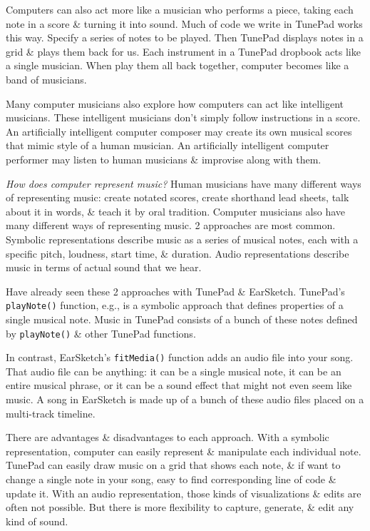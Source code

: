 \documentclass{article}
\begin{document}
\begin{itemize}
\begin{itemize}
		Computers can also act more like a musician who performs a piece, taking each note in a score \& turning it into sound. Much of code we write in TunePad works this way. Specify a series of notes to be played. Then TunePad displays notes in a grid \& plays them back for us. Each instrument in a TunePad dropbook acts like a single musician. When play them all back together, computer becomes like a band of musicians.
		
		Many computer musicians also explore how computers can act like intelligent musicians. These intelligent musicians don't simply follow instructions in a score. An artificially intelligent computer composer may create its own musical scores that mimic style of a human musician. An artificially intelligent computer performer may listen to human musicians \& improvise along with them.
		
		{\it How does computer represent music?} Human musicians have many different ways of representing music: create notated scores, create shorthand lead sheets, talk about it in words, \& teach it by oral tradition. Computer musicians also have many different ways of representing music. 2 approaches are most common. Symbolic representations describe music as a series of musical notes, each with a specific pitch, loudness, start time, \& duration. Audio representations describe music in terms of actual sound that we hear.
		
		Have already seen these 2 approaches with TunePad \& EarSketch. TunePad's {\tt playNote()} function, e.g., is a symbolic approach that defines properties of a single musical note. Music in TunePad consists of a bunch of these notes defined by {\tt playNote()} \& other TunePad functions.
		
		In contrast, EarSketch's {\tt fitMedia()} function adds an audio file into your song. That audio file can be anything: it can be a single musical note, it can be an entire musical phrase, or it can be a sound effect that might not even seem like music. A song in EarSketch is made up of a bunch of these audio files placed on a multi-track timeline.
		
		There are advantages \& disadvantages to each approach. With a symbolic representation, computer can easily represent \& manipulate each individual note. TunePad can easily draw music on a grid that shows each note, \& if want to change a single note in your song, easy to find corresponding line of code \& update it. With an audio representation, those kinds of visualizations \& edits are often not possible. But there is more flexibility to capture, generate, \& edit any kind of sound.
		

\end{itemize}
\end{itemize}
\end{document}
